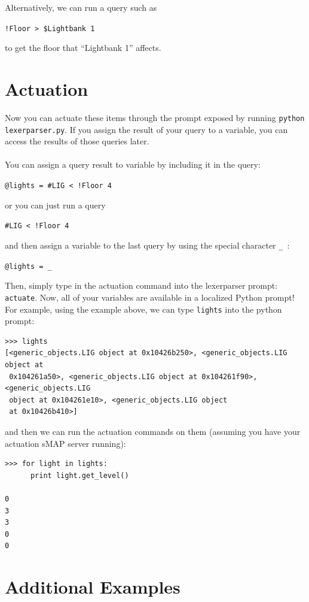 \documentclass{article}
\begin{document}
Alternatively, we can run a query such as 
\begin{center}
\verb+!Floor > $Lightbank 1+
\end{center}
to get the floor that ``Lightbank 1'' affects.

\section{Actuation}
Now you can actuate these items through the prompt exposed by running \verb+python lexerparser.py+. If you assign the result of your query to a variable, you can access the results of those queries later.
\\\\
You can assign a query result to variable by including it in the query:
\begin{center}
\verb+@lights = #LIG < !Floor 4+
\end{center}
or you can just run a query
\begin{center}
\verb+#LIG < !Floor 4+
\end{center}
and then assign a variable to the last query by using the special character \verb+_ +:
\begin{center}
\verb+@lights = _+
\end{center}
Then, simply type in the actuation command into the lexerparser prompt: \verb+actuate+. Now, all of your variables are available in a localized Python prompt! For example, using the example above, we can type \verb+lights+ into the python prompt:

\begin{verbatim}
>>> lights
[<generic_objects.LIG object at 0x10426b250>, <generic_objects.LIG object at
 0x104261a50>, <generic_objects.LIG object at 0x104261f90>, <generic_objects.LIG
 object at 0x104261e10>, <generic_objects.LIG object
 at 0x10426b410>]
\end{verbatim}
and then we can run the actuation commands on them (assuming you have your actuation sMAP server running):
\begin{verbatim}
>>> for light in lights:
      print light.get_level()

0
3
3
0
0
\end{verbatim}

\section{Additional Examples} %
\label{sub:additional_examples}
\end{document}
